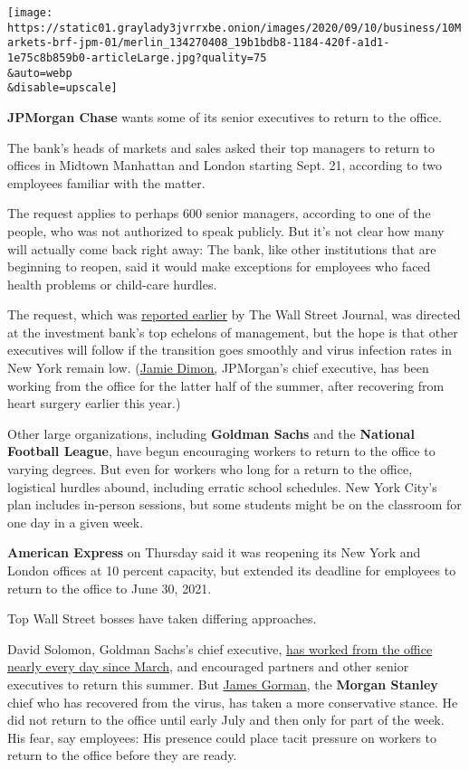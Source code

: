 \texttt{[image: https://static01.graylady3jvrrxbe.onion/images/2020/09/10/business/10Markets-brf-jpm-01/merlin\_134270408\_19b1bdb8-1184-420f-a1d1-1e75c8b859b0-articleLarge.jpg?quality=75\\\&auto=webp\\\&disable=upscale]}

\textbf{JPMorgan Chase} wants some of its senior executives to return to
the office.

The bank's heads of markets and sales asked their top managers to return
to offices in Midtown Manhattan and London starting Sept. 21, according
to two employees familiar with the matter.

The request applies to perhaps 600 senior managers, according to one of
the people, who was not authorized to speak publicly. But it's not clear
how many will actually come back right away: The bank, like other
institutions that are beginning to reopen, said it would make exceptions
for employees who faced health problems or child-care hurdles.

The request, which was
\href{https://www.wsj.com/articles/jpmorgan-top-brass-tell-trading-floor-staff-to-come-back-to-the-office-11599757313?mod=hp_lead_pos2}{reported
earlier} by The Wall Street Journal, was directed at the investment
bank's top echelons of management, but the hope is that other executives
will follow if the transition goes smoothly and virus infection rates in
New York remain low.
(\href{https://www.nytimes3xbfgragh.onion/2020/03/05/business/jamie-dimon-heart-surgery.html}{Jamie
Dimon,} JPMorgan's chief executive, has been working from the office for
the latter half of the summer, after recovering from heart surgery
earlier this year.)

Other large organizations, including \textbf{Goldman Sachs} and the
\textbf{National Football League}, have begun encouraging workers to
return to the office to varying degrees. But even for workers who long
for a return to the office, logistical hurdles abound, including erratic
school schedules. New York City's plan includes in-person sessions, but
some students might be on the classroom for one day in a given week.

\textbf{American Express} on Thursday said it was reopening its New York
and London offices at 10 percent capacity, but extended its deadline for
employees to return to the office to June 30, 2021.

Top Wall Street bosses have taken differing approaches.

David Solomon, Goldman Sachs's chief executive,
\href{https://www.nytimes3xbfgragh.onion/2020/08/11/business/goldman-sachs-david-solomon-coronavirus.html}{has
worked from the office nearly every day since March}, and encouraged
partners and other senior executives to return this summer. But
\href{https://www.nytimes3xbfgragh.onion/2020/05/26/technology/ceo-coronavirus-booking-holdings-fogel.html}{James
Gorman}, the \textbf{Morgan Stanley} chief who has recovered from the
virus, has taken a more conservative stance. He did not return to the
office until early July and then only for part of the week. His fear,
say employees: His presence could place tacit pressure on workers to
return to the office before they are ready.

